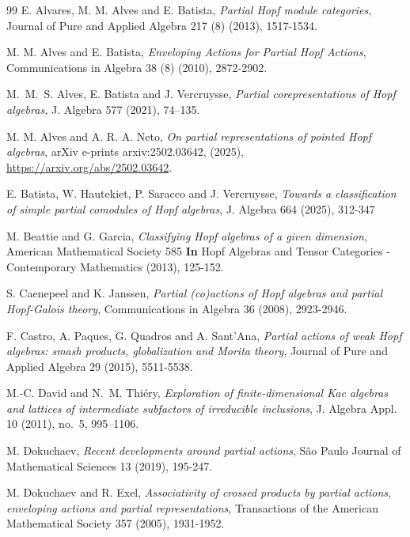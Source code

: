 \documentclass[reqno]{amsart}
\theoremstyle{definition}
\numberwithin{equation}{section}\theoremstyle{plain}
\theoremstyle{definition}
\begin{document}

\begin{thebibliography}{99}	
	 E. Alvares, M. M. Alves and E. Batista, \emph{Partial Hopf module categories}, Journal of Pure and Applied Algebra 217 (8) (2013), 1517-1534.

	 M. M. Alves and E. Batista, \emph{Enveloping Actions for Partial Hopf Actions}, Communications in Algebra 38 (8) (2010), 2872-2902.

     M.~M.~S. Alves, E. Batista and J. Vercruysse, \emph{Partial corepresentations of Hopf algebras,} J. Algebra  577 (2021), 74--135.

     M. M. Alves and A. R. A. Neto, \emph{On partial representations of pointed Hopf algebras}, arXiv e-prints arxiv:2502.03642, (2025), \url{https://arxiv.org/abs/2502.03642}.    

     E. Batista, W. Hautekiet, P. Saracco and J. Vercruysse, \emph{Towards a classification
    of simple partial comodules of Hopf algebras}, J. Algebra 664 (2025), 312-347

	 M. Beattie and G. Garcia, \emph{Classifying Hopf algebras of a given dimension}, American Mathematical Society 585 \textbf{In} Hopf Algebras and Tensor Categories - Contemporary Mathematics  (2013), 125-152.
	
	 S. Caenepeel and K. Janssen, \emph{Partial (co)actions of Hopf algebras and partial Hopf-Galois theory}, Communications in Algebra 36 (2008), 2923-2946.

	 F. Castro, A. Paques, G. Quadros and A. Sant'Ana, \emph{Partial actions of weak Hopf algebras: smash products, globalization and Morita theory}, Journal of Pure and Applied Algebra 29 (2015), 5511-5538.

     M.-C. David and N.~M. Thi\'ery, \emph{Exploration of finite-dimensional Kac algebras and lattices of intermediate subfactors of irreducible inclusions}, J. Algebra Appl.  10 (2011), no.~5, 995--1106.

	 M. Dokuchaev, \emph{Recent developments around partial actions}, São Paulo Journal of Mathematical Sciences 13 (2019), 195-247.

	 M. Dokuchaev and R. Exel, \emph{Associativity of crossed products by partial actions, enveloping actions and partial representations}, Transactions of the American Mathematical Society 357 (2005), 1931-1952.


\end{thebibliography}
\end{document}
